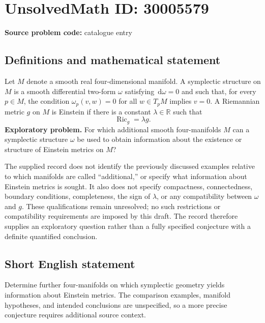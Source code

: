 \documentclass[11pt]{article}
\newcommand{\R}{\mathbb{R}}
\newcommand{\dd}{\,\mathrm{d}}
\begin{document}
\section*{UnsolvedMath ID: 30005579}
\textbf{Source problem code:} catalogue entry
\subsection{Definitions and mathematical statement}
Let \(M\) denote a smooth real four-dimensional manifold. A symplectic structure on \(M\) is a smooth differential two-form \(\omega\) satisfying \(\dd\omega=0\) and such that, for every \(p\in M\), the condition \(\omega_p(v,w)=0\) for all \(w\in T_pM\) implies \(v=0\). A Riemannian metric \(g\) on \(M\) is Einstein if there is a constant \(\lambda\in\R\) such that
\[
\operatorname{Ric}_g=\lambda g.
\]
\textbf{Exploratory problem.} For which additional smooth four-manifolds \(M\) can a symplectic structure \(\omega\) be used to obtain information about the existence or structure of Einstein metrics on \(M\)?

The supplied record does not identify the previously discussed examples relative to which manifolds are called ``additional,'' or specify what information about Einstein metrics is sought. It also does not specify compactness, connectedness, boundary conditions, completeness, the sign of \(\lambda\), or any compatibility between \(\omega\) and \(g\). These qualifications remain unresolved; no such restrictions or compatibility requirements are imposed by this draft. The record therefore supplies an exploratory question rather than a fully specified conjecture with a definite quantified conclusion.
\subsection{Short English statement}
Determine further four-manifolds on which symplectic geometry yields information about Einstein metrics. The comparison examples, manifold hypotheses, and intended conclusions are unspecified, so a more precise conjecture requires additional source context.
\end{document}

